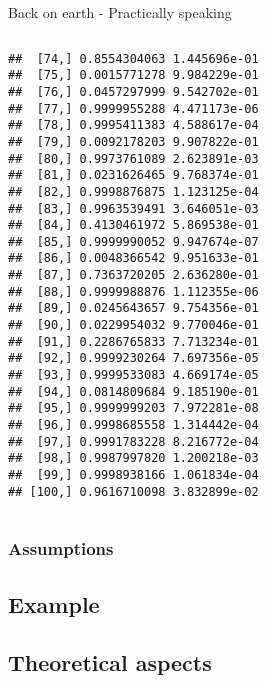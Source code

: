 \begin{frame}[fragile]{Back on earth - Practically speaking}
\begin{columns}
\begin{column}{0.5\textwidth}
\begin{knitrout}
\begin{kframe}
\begin{verbatim}
##  [74,] 0.8554304063 1.445696e-01
##  [75,] 0.0015771278 9.984229e-01
##  [76,] 0.0457297999 9.542702e-01
##  [77,] 0.9999955288 4.471173e-06
##  [78,] 0.9995411383 4.588617e-04
##  [79,] 0.0092178203 9.907822e-01
##  [80,] 0.9973761089 2.623891e-03
##  [81,] 0.0231626465 9.768374e-01
##  [82,] 0.9998876875 1.123125e-04
##  [83,] 0.9963539491 3.646051e-03
##  [84,] 0.4130461972 5.869538e-01
##  [85,] 0.9999990052 9.947674e-07
##  [86,] 0.0048366542 9.951633e-01
##  [87,] 0.7363720205 2.636280e-01
##  [88,] 0.9999988876 1.112355e-06
##  [89,] 0.0245643657 9.754356e-01
##  [90,] 0.0229954032 9.770046e-01
##  [91,] 0.2286765833 7.713234e-01
##  [92,] 0.9999230264 7.697356e-05
##  [93,] 0.9999533083 4.669174e-05
##  [94,] 0.0814809684 9.185190e-01
##  [95,] 0.9999999203 7.972281e-08
##  [96,] 0.9998685558 1.314442e-04
##  [97,] 0.9991783228 8.216772e-04
##  [98,] 0.9987997820 1.200218e-03
##  [99,] 0.9998938166 1.061834e-04
## [100,] 0.9616710098 3.832899e-02
\end{verbatim}
\begin{alltt}
 \hlkwb{<-}  \hlopt{$}
\end{alltt}
\end{kframe}
\end{knitrout}
\end{column}
\begin{column}{0.5\textwidth}
\end{column}
\end{columns}
\end{frame}

\subsubsection*{Assumptions}
\subsection*{Example}
\subsection*{Theoretical aspects}

